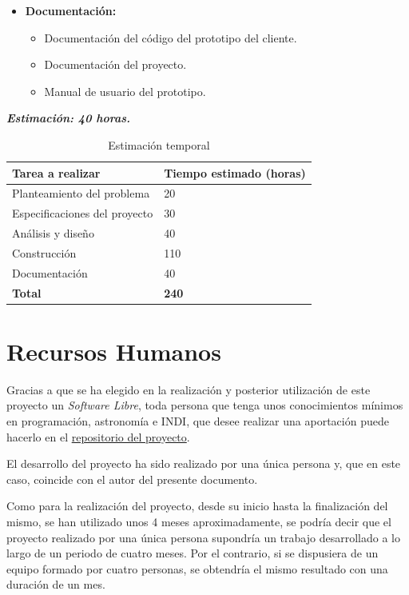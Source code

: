 \begin{itemize}
  \item \textbf{Documentación:}
  \begin{itemize}
    \item Documentación del código del prototipo del cliente.
    \item Documentación del proyecto.
    \item Manual de usuario del prototipo.
  \end{itemize}
\end{itemize}
\textit{\textbf{Estimación: 40 horas.}}


\begin{table}[h]
\centering
\label{table:tiempoEstimado}
\begin{tabular}{ll}
\hline
{\bf Tarea a realizar}                   & {\bf Tiempo estimado (horas)} \\ \hline
Planteamiento del problema    & 20                            \\
Especificaciones del proyecto & 30                            \\
Análisis y diseño             & 40                            \\
Construcción                  & 110                           \\
Documentación                 & 40                            \\
{\bf Total}                   & {\bf 240}                           \\ \hline
\end{tabular}
\caption{Estimación temporal}
\end{table}


\section{Recursos Humanos}
Gracias a que se ha elegido en la realización y posterior utilización de este proyecto un \textit{Software Libre}, toda persona que tenga unos conocimientos mínimos en programación, astronomía e INDI, que desee realizar una aportación puede hacerlo en el \href{https://github.com/PabloTorrecillas/IndiWebClient}{repositorio del proyecto}.

El desarrollo del proyecto ha sido realizado por una única persona y, que en este caso, coincide con el autor del presente documento.

Como para la realización del proyecto, desde su inicio hasta la finalización del mismo, se han utilizado unos 4 meses aproximadamente, se podría decir que el proyecto realizado por una única persona supondría un trabajo desarrollado a lo largo de un periodo de cuatro meses. Por el contrario, si se dispusiera de un equipo formado por cuatro personas, se obtendría el mismo resultado con una duración de un mes.

